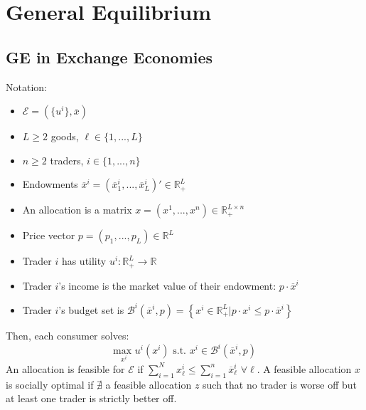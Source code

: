\documentclass{article}
\newcommand{\R}{\mathbb{R}}
\newcommand{\usmax}[1]{\underset{#1}{\text{max }}}
\newcommand{\olx}{\overline{x}}
\newcommand{\B}{\mathcal{B}}
\newcommand{\Epsilon}{\mathcal{E}}
\newcommand{\blue}[1]{{\color{blue}#1}}
\newcommand{\sumn}{\sum_{i=1}^n}
\begin{document}
\pagebreak
\section{General Equilibrium}



\subsection{GE in Exchange Economies}
Notation:
\begin{itemize}
	\item $\Epsilon = (\{u^i\},\overline{x})$
	\item $L\geq 2$ goods, $\ell\in\{1,...,L\}$
	\item $n\geq 2$ traders, $i\in\{1,...,n\}$
	\item Endowments $\overline{x}^i=(\olx_1^i,...,\olx_L^i)'\in\R_+^L$ 
	\item An allocation is a matrix $x=(x^1,...,x^n)\in\R_+^{L\times n}$
	\item Price vector $p=(p_1,...,p_L)\in\R^L$
	\item Trader $i$ has utility $u^i:\R_+^L\rightarrow\R$
	\item Trader $i$'s income is the market value of their endowment: $p\cdot \olx^i$
	\item Trader $i$'s budget set is $\B^i(\olx^i,p) = \left\{x^i\in\R_+^L|p\cdot x^i\leq p\cdot\olx^i\right\}$
\end{itemize}
Then, each consumer solves:
\[
	\usmax{x^i}u^i(x^i)\text{ s.t. }x^i\in\B^i(\olx^i,p)
\]
An allocation is \blue{feasible} for $\Epsilon$ if $\sum_{i=1}^Nx_\ell^i\leq\sumn \olx_\ell^i$ $\forall \ell$. A feasible allocation $x$ is \blue{socially optimal} if $\nexists$ a feasible allocation $z$ such that no trader is worse off but at least one trader is strictly better off.

\pagebreak
\end{document}
